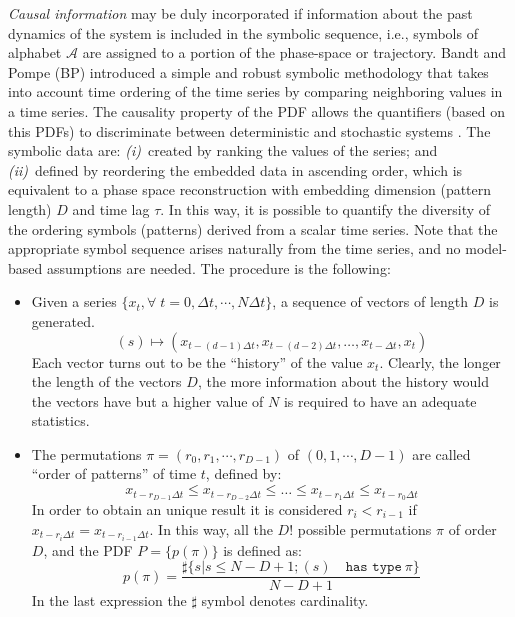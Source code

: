 {\it Causal information\/} may be duly incorporated if information about the past dynamics of the system is included in the symbolic sequence, i.e., symbols of alphabet $\mathcal{A}$ are assigned to a portion of the phase-space or trajectory.
Bandt and Pompe (BP)\cite{Bandt2002} introduced a simple and robust symbolic methodology that takes into account time ordering of the time series by comparing neighboring values in a time series.
The causality property of the PDF allows the quantifiers (based on this PDFs) to discriminate between deterministic and stochastic systems \cite{Rosso2007B}.
The symbolic data are:
{\it (i)\/}~created by ranking the values of the series; and
{\it (ii)\/}~defined by reordering the embedded data in ascending order, which is equivalent to a phase space reconstruction with embedding dimension (pattern length) $D$ and time lag $\tau$.
In this way, it is possible to quantify the diversity of the ordering symbols (patterns) derived from a scalar time series.
Note that the appropriate symbol sequence arises naturally from the time series, and no model-based assumptions 
are needed.
The procedure is the following:
\begin{itemize}
	\item Given a series $\{x_t, \forall \; t=0, \Delta t, \cdots,N\Delta t \}$, a sequence of vectors of length $D$ is generated.
		\begin{equation}
		(s)\longmapsto\left(x_{t-(d-1)\Delta t},x_{t-(d-2)\Delta t},\dots,x_{t-\Delta t},x_{t}\right) 
		\label{eq:vectores}
		\end{equation}
		Each vector turns out to be the ``history'' of the value $x_t$. Clearly, the longer the length of the vectors $D$, the more information about the history would the vectors have but a higher value of $N$ is required to have an adequate statistics. 
	\item The permutations $\pi=(r_0, r_1, \cdots, r_{D-1})$ of $(0, 1, \cdots, D-1)$ are called ``order of patterns'' of time $t$, defined by:
		\begin{equation}
		\label{eq:permuta}
		x_{t-r_{D-1}\Delta t}\le x_{t-r_{D-2}\Delta t}\le\dots\le x_{t-r_{1}\Delta t}\le x_{t-r_0\Delta t}
		\end{equation}
		In order to obtain an unique result it is considered $r_i<r_{i-1}$ if $x_{t-r_{i}\Delta t}=x_{t-r_{i-1}\Delta t}$.
		In this way, all the $D!$ possible permutations $\pi$ of order $D$, and the PDF $P=\{p(\pi)\}$ is defined as:
		\begin{equation}
		\label{eq:frequ}
		p(\pi)=\frac{\sharp \{s|s\leq N-D+1; (s) \quad \texttt{has type}~\pi\}}{N-D+1}
		\end{equation}
		In the last expression the $\sharp$ symbol denotes cardinality.
\end{itemize}

